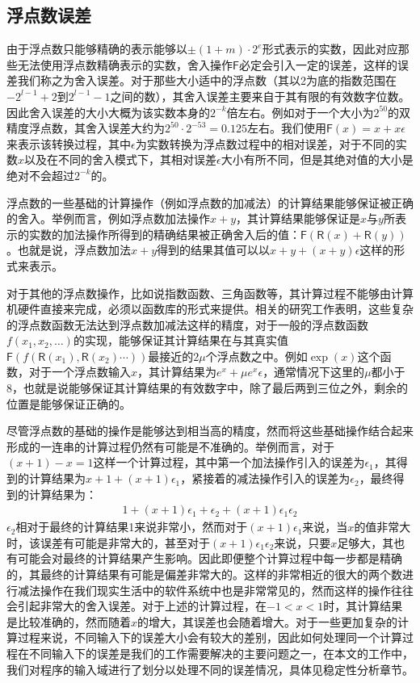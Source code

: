 \subsection{浮点数误差}

由于浮点数只能够精确的表示能够以$\pm(1+m) \cdot 2^e$形式表示的实数，因此对应那些无法使用浮点数精确表示的实数，舍入操作$\mathsf{F}$必定会引入一定的误差，这样的误差我们称之为舍入误差\cite{ortega1990numerica}。对于那些大小适中的浮点数（其以2为底的指数范围在$-2^{l-1}+2$到$2^{l-1}-1$之间的数），其舍入误差主要来自于其有限的有效数字位数。因此舍入误差的大小大概为该实数本身的$2^{-k}$倍左右。例如对于一个大小为$2^{50}$的双精度浮点数，其舍入误差大约为$2^{50} \cdot 2^{-53} = 0.125$左右。我们使用$\mathsf{F}(x) = x + x\epsilon$来表示该转换过程，其中$\epsilon$为实数转换为浮点数过程中的相对误差，对于不同的实数$x$以及在不同的舍入模式下，其相对误差$\epsilon$大小有所不同，但是其绝对值的大小是绝对不会超过$2^{-k}$的。

浮点数的一些基础的计算操作（例如浮点数的加减法）的计算结果能够保证被正确的舍入。举例而言，例如浮点数加法操作$x+y$，其计算结果能够保证是$x$与$y$所表示的实数的加法操作所得到的精确结果被正确舍入后的值：$\mathsf{F}(\mathsf{R}(x)+\mathsf{R}(y))$。也就是说，浮点数加法$x+y$得到的结果其值可以以$x+y+(x+y)\epsilon$这样的形式来表示。

对于其他的浮点数操作，比如说指数函数、三角函数等，其计算过程不能够由计算机硬件直接来完成，必须以函数库的形式来提供。相关的研究工作\cite{lefevre1998table}表明，这些复杂的浮点数函数无法达到浮点数加减法这样的精度，对于一般的浮点数函数$f(x_1, x_2, \ldots)$的实现，能够保证其计算结果在与其真实值$\mathsf{F}(f(\mathsf{R}(x_1), \mathsf{R}(x_2) \cdots))$最接近的$2\mu$个浮点数之中。例如$\exp(x)$这个函数，对于一个浮点数输入$x$，其计算结果为$e^x+\mu e^x \epsilon$，通常情况下这里的$\mu$都小于8，也就是说能够保证其计算结果的有效数字中，除了最后两到三位之外，剩余的位置是能够保证正确的。

尽管浮点数的基础的操作是能够达到相当高的精度，然而将这些基础操作结合起来形成的一连串的计算过程仍然有可能是不准确的。举例而言，对于$(x+1)-x = 1$这样一个计算过程，其中第一个加法操作引入的误差为$\epsilon_1$，其得到的计算结果为$x+1+(x+1)\epsilon_1$，紧接着的减法操作引入的误差为$\epsilon_2$，最终得到的计算结果为：
\begin{gather*}
    1+(x+1)\epsilon_1+\epsilon_2+(x+1)\epsilon_1\epsilon_2
\end{gather*}
$\epsilon_2$相对于最终的计算结果1来说非常小，然而对于$(x+1)\epsilon_1$来说，当$x$的值非常大时，该误差有可能是非常大的，甚至对于$(x+1)\epsilon_1\epsilon_2$来说，只要$x$足够大，其也有可能会对最终的计算结果产生影响。因此即便整个计算过程中每一步都是精确的，其最终的计算结果有可能是偏差非常大的。这样的非常相近的很大的两个数进行减法操作在我们现实生活中的软件系统中也是非常常见的，然而这样的操作往往会引起非常大的舍入误差。对于上述的计算过程，在$-1<x<1$时，其计算结果是比较准确的，然而随着$x$的增大，其误差也会随着增大。对于一些更加复杂的计算过程来说，不同输入下的误差大小会有较大的差别，因此如何处理同一个计算过程在不同输入下的误差是我们的工作需要解决的主要问题之一，在本文的工作中，我们对程序的输入域进行了划分以处理不同的误差情况，具体见稳定性分析章节。

